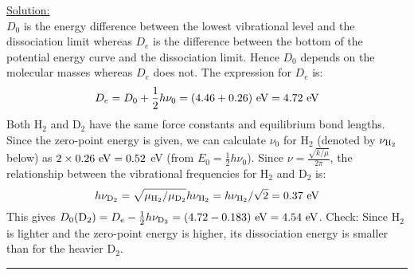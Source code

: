 \noindent
\underline{Solution:}\\

\noindent
$D_0$ is the energy difference between the lowest vibrational level and the dissociation limit whereas $D_e$ is the difference between the bottom of the potential energy curve and the dissociation limit. Hence $D_0$ depends on the molecular masses whereas $D_e$ does not. The expression for $D_e$ is:
$$D_e = D_0 + \frac{1}{2}h\nu_0 = (4.46 + 0.26)\textnormal{ eV} = 4.72\textnormal{ eV}$$
Both H$_2$ and D$_2$ have the same force constants and equilibrium bond lengths. Since the zero-point energy is given, we can calculate $\nu_0$ for H$_2$ (denoted by $\nu_{\textnormal{H}_2}$ below) as $2\times 0.26\textnormal{ eV} = 0.52$ eV (from $E_0 = \frac{1}{2}h\nu_0$). Since $\nu = \frac{\sqrt{k/\mu}}{2\pi}$, the relationship between the vibrational frequencies for H$_2$ and D$_2$ is:
$$h\nu_{\textnormal{D}_2} = \sqrt{\mu_{\textnormal{H}_2}/\mu_{\textnormal{D}_2}}h\nu_{\textnormal{H}_2} = h\nu_{\textnormal{H}_2} / \sqrt{2} = 0.37\textnormal{ eV}$$
This gives $D_0(\textnormal{D}_2) = D_e - \frac{1}{2}h\nu_{\textnormal{D}_2} = (4.72 - 0.183)\textnormal{ eV} = 4.54\textnormal{ eV}$. Check: Since H$_2$ is lighter and the zero-point energy is higher, its dissociation energy is smaller than for the heavier D$_2$.

\hrule\vspace{0.5cm}



